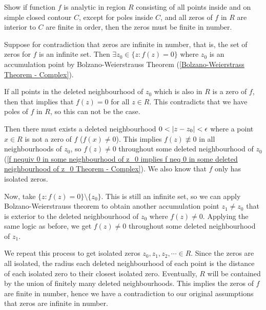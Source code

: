\documentclass[12pt, english]{book}
\makeatletter
\renewenvironment{proof}[1][\proofname]{\par
	\pushQED{\qed}%
	\normalfont \topsep6\p@\@plus6\p@\relax
	\list{}{%
		\settowidth{\leftmargin}{\itshape\proofname:\hskip\labelsep}%
		\setlength{\labelwidth}{0pt}%
		\setlength{\itemindent}{-\leftmargin}%
		}%
	\item[\hskip\labelsep\itshape#1\@addpunct{:}]\ignorespaces
	}{\popQED\endlist\@endpefalse}
\makeatother
\begin{document}
	\begin{example}
		\label{Finite order of zeros in simple closed contour implies finite zeros Example - Complex}
		Show if function \(f\) is analytic in region \(R\) consisting of all points inside and on simple closed contour \(C\), except for poles inside \(C\), and all zeros of \(f\) in \(R\) are interior to \(C\) are finite in order, then the zeros must be finite in number.
		
	\end{example}
	\begin{proof}
		{\color{Grey}
		Suppose for contradiction that zeros are infinite in number, that is, the set of zeros for \(f\) is an infinite set. Then \(\exists z_0 \in \{z : f(z) = 0\}\) where \(z_0\) is an accumulation point by Bolzano-Weierstrauss Theorem (\cref{Bolzano-Weierstrass Theorem - Complex}).
		
		If all points in the deleted neighbourhood of \(z_0\) which is also in \(R\) is a zero of \(f\), then that implies that \(f(z) = 0\) for all \(z \in R\). This contradicts that we have poles of \(f\) in \(R\), so this can not be the case. 
		
		Then there must exists a deleted neighbourhood \(0 < \abs{z-z_0}<\epsilon\) where a point \(x \in R\) is not a zero of \(f\) (\(f(x) \neq 0\)). This implies \(f(z) \nequiv 0\) in all neighbourhoods of \(z_0\), so \(f(z) \neq 0\) throughout some deleted neighbourhood of \(z_0\) (\cref{f nequiv 0 in some neighbourhood of z_0 implies f neq 0 in some deleted neighbourhood of z_0 Theorem - Complex}). We also know that \(f\) only has isolated zeros.
		
		Now, take \(\{z : f(z) = 0\} \setminus \{z_0\}\). This is still an infinite set, so we can apply Bolzano-Weierstrauss theorem to obtain another accumulation point \(z_1 \neq z_0\) that is exterior to the deleted neighbourhood of \(z_0\) where \(f(z) \neq 0\). Applying the same logic as before, we get \(f(z) \neq 0\) throughout some deleted neighbourhood of \(z_1\). 
		
		We repeat this process to get isolated zeros \(z_0, z_1, z_2, \cdots \in R\). Since the zeros are all isolated, the radius each deleted neighbourhood of each point is the distance of each isolated zero to their closest isolated zero. Eventually, \(R\) will be contained by the union of finitely many deleted neighbourhoods. This implies the zeros of \(f\) are finite in number, hence we have a contradiction to our original assumptions that zeros are infinite in number.
		}
	\end{proof}
\end{document}

